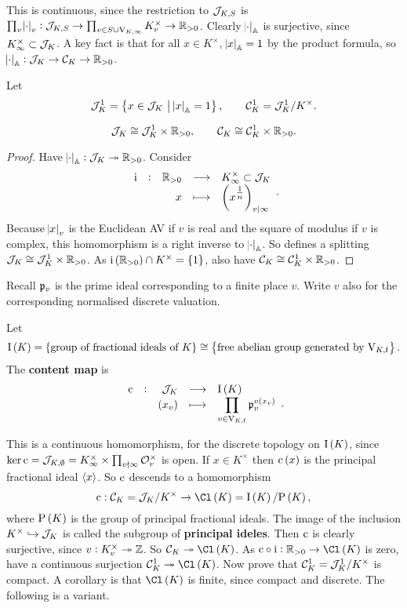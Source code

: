 This is continuous, since the restriction to $ \mathcal{J}_{K, S} $ is $ \prod_v \abs{\cdot}_v : \mathcal{J}_{K, S} \to \prod_{v \in S \cup \mathrm{V}_{K, \infty}} K_v^\times \to \mathbb{R}_{> 0} $. Clearly $ \abs{\cdot}_{\mathbb{A}} $ is surjective, since $ K_\infty^\times \subset \mathcal{J}_K $. A key fact is that for all $ x \in K^\times $, $ \abs{x}_{\mathbb{A}} = 1 $ by the product formula, so $ \abs{\cdot}_{\mathbb{A}} : \mathcal{J}_K \to \mathcal{C}_K \to \mathbb{R}_{> 0} $.

\begin{definition*}
Let
$$ \JJJ_K^1 = \cbr{x \in \JJJ_K \st \abs{x}_\AA = 1}, \qquad \CCC_K^1 = \JJJ_K^1 / K^\times. $$
\end{definition*}

\begin{proposition}
$$ \mathcal{J}_K \cong \mathcal{J}_K^1 \times \mathbb{R}_{> 0}, \qquad \mathcal{C}_K \cong \mathcal{C}_K^1 \times \mathbb{R}_{> 0}. $$
\end{proposition}

\begin{proof}
Have $ \abs{\cdot}_{\mathbb{A}} : \mathcal{J}_K \twoheadrightarrow \mathbb{R}_{> 0} $. Consider
$$ \function[\i]{\RR_{> 0}}{K_\infty^\times \subset \JJJ_K}{x}{\br{x^{\tfrac{1}{n}}}_{v \mid \infty}}. $$
Because $ \abs{x}_v $ is the Euclidean AV if $ v $ is real and the square of modulus if $ v $ is complex, this homomorphism is a right inverse to $ \abs{\cdot}_{\mathbb{A}} $. So defines a splitting $ \mathcal{J}_K \cong \mathcal{J}_K^1 \times \mathbb{R}_{> 0} $. As $ \i\br{\RR_{> 0}} \cap K^\times = \cbr{1} $, also have $ \mathcal{C}_K \cong \mathcal{C}_K^1 \times \mathbb{R}_{> 0} $.
\end{proof}

Recall $ \mathfrak{p}_v $ is the prime ideal corresponding to a finite place $ v $. Write $ v $ also for the corresponding normalised discrete valuation.

\begin{definition*}
Let
$$ \I\br{K} = \cbr{\text{group of fractional ideals of} \ K} \cong \cbr{\text{free abelian group generated by} \ \V_{K, \f}}. $$
The \textbf{content map} is
$$ \function[\c]{\JJJ_K}{\I\br{K}}{\br{x_v}}{\prod_{v \in \V_{K, \f}} \ppp_v^{v\br{x_v}}}. $$
\end{definition*}

This is a continuous homomorphism, for the discrete topology on $ \I\br{K} $, since $ \ker \mathrm{c} = \mathcal{J}_{K, \emptyset} = K_\infty^\times \times \prod_{v \nmid \infty} \mathcal{O}_v^\times $ is open. If $ x \in K^\times $ then $ \c\br{x} $ is the principal fractional ideal $ \left\langle x \right\rangle $. So $ \mathrm{c} $ descends to a homomorphism
$$ \c : \CCC_K = \JJJ_K / K^\times \to \Cl\br{K} = \I\br{K} / \P\br{K}, $$
where $ \P\br{K} $ is the group of principal fractional ideals. The image of the inclusion $ K^\times \hookrightarrow \mathcal{J}_K $ is called the subgroup of \textbf{principal ideles}. Then $ \mathrm{c} $ is clearly surjective, since $ v : K_v^\times \twoheadrightarrow \mathbb{Z} $. So $ \CCC_K \twoheadrightarrow \Cl\br{K} $. As $ \c \circ \i : \RR_{> 0} \to \Cl\br{K} $ is zero, have a continuous surjection $ \CCC_K^1 \twoheadrightarrow \Cl\br{K} $. Now prove that $ \mathcal{C}_K^1 = \mathcal{J}_K^1 / K^\times $ is compact. A corollary is that $ \Cl\br{K} $ is finite, since compact and discrete. The following is a variant.

